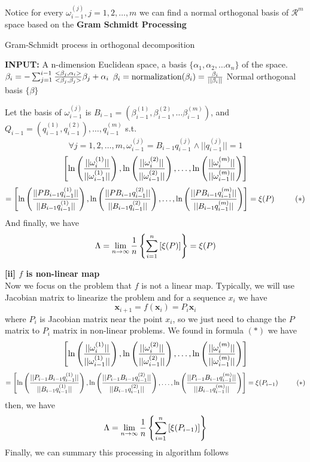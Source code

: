 \documentclass[12pt]{article}
\theoremstyle{plain}
\begin{document}
Notice for every $\omega^{(j)}_{i-1}, j = 1, 2, \ldots, m$ we can find a normal orthogonal basis of $\mathcal R^m$ space based on the \textbf{Gram Schmidt Processing}

\begin{algorithm}[H]
\caption{Gram-Schmidt process in orthogonal decomposition}\label{gram-schmidt}
\begin{algorithmic}
\State \textbf{INPUT:} A n-dimension Euclidean space, a basis $\{\alpha_1, \alpha_2, \ldots \alpha_n\}$ of the space.
\State {}
    \State $\beta_{i} = -\sum_{j = 1}^{i-1}{<\beta_j, \alpha_{i}> \over <\beta_j, \beta_j>}\beta_j + \alpha_i$
    \State $\beta_i = \text{normalization}(\beta_i) = {\beta_i \over ||\beta_i||}$
\EndFor
\State \Return Normal orthogonal basis $\{\beta\}$
\EndProcedure
\end{algorithmic}
\end{algorithm}

Let the basis of $\omega^{(j)}_{i-1}$ is $B_{i-1} = (\beta^{(1)}_{i-1}, \beta^{(2)}_{i-1}, \ldots \beta^{(m)}_{i-1})$, and $Q_{i-1} = (q^{(1)}_{i-1}, q^{(2)}_{i-1}), \ldots , q^{(m)}_{i-1}$ s.t.
$$
\forall j = 1, 2, \ldots, m, \omega^{(j)}_{i-1} = B_{i-1}q^{(j)}_{i-1} \land ||q^{(j)}_{i-1}|| = 1
$$
$$
\left[
\ln\left({||\omega^{(1)}_i|| \over ||\omega^{(1)}_{i-1}||}\right),
\ln\left({||\omega^{(2)}_i|| \over ||\omega^{(2)}_{i-1}||}\right),
\ldots,
\ln\left({||\omega^{(m)}_i|| \over ||\omega^{(m)}_{i-1}||}\right)
\right] 
$$
$$
= 
\left[
\ln\left({||PB_{i-1}q^{(1)}_{i-1}|| \over ||B_{i-1}q^{(1)}_{i-1}||}\right),
\ln\left({||PB_{i-1}q^{(2)}_{i-1}|| \over ||B_{i-1}q^{(2)}_{i-1}||}\right),
\ldots,
\ln\left({||PB_{i-1}q^{(m)}_{i-1}|| \over ||B_{i-1}q^{(m)}_{i-1}||}\right)
\right] 
= 
\xi(P) \ \ \ \ \ \ \ \ (*)
$$
And finally, we have
$$
\Lambda
= \lim_{n \rightarrow \infty}{1\over n}\left\{
\sum_{i = 1}^{n}
\left[
\xi(P)
\right]\right\} = \xi(P)
$$



\textbf{[ii] $f$ is non-linear map}
\\\noindent Now we focus on the problem that $f$ is not a linear map. Typically, we will use Jacobian matrix to linearize the problem and for a sequence $x_i$ we have 
$$
\mathbf x_{i+1} = f(\mathbf x_i) = P_i \mathbf x_i
$$
where $P_i$ is Jacobian matrix near the point $x_i$, so we just need to change the $P$ matrix to $P_i$ matrix in non-linear problems. We found in formula $(*)$ we have
$$
\left[
\ln\left({||\omega^{(1)}_i|| \over ||\omega^{(1)}_{i-1}||}\right),
\ln\left({||\omega^{(2)}_i|| \over ||\omega^{(2)}_{i-1}||}\right),
\ldots,
\ln\left({||\omega^{(m)}_i|| \over ||\omega^{(m)}_{i-1}||}\right)
\right] 
$$
$$
= 
\left[
\ln\left({||P_{i-1}B_{i-1}q^{(1)}_{i-1}|| \over ||B_{i-1}q^{(1)}_{i-1}||}\right),
\ln\left({||P_{i-1}B_{i-1}q^{(2)}_{i-1}|| \over ||B_{i-1}q^{(2)}_{i-1}||}\right),
\ldots,
\ln\left({||P_{i-1}B_{i-1}q^{(m)}_{i-1}|| \over ||B_{i-1}q^{(m)}_{i-1}||}\right)
\right] 
= 
\xi(P_{i-1}) \ \ \ \ \ \ \ \ (*)
$$
then, we have
$$
\Lambda
= \lim_{n \rightarrow \infty}{1\over n}\left\{
\sum_{i = 1}^{n}
\left[
\xi(P_{i-1})
\right]\right\}
$$
Finally, we can summary this processing in algorithm follows
\end{document}
